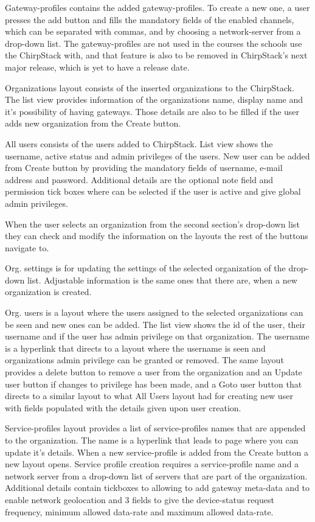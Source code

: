 Gateway-profiles contains the added gateway-profiles.
To create a new one, a user presses the add button and fills the mandatory fields of the enabled channels, which can be separated with commas, and by choosing a network-server from a drop-down list.
The gateway-profiles are not used in the courses the schools use the ChirpStack with, and that feature is also to be removed in ChirpStack's next major release, which is yet to have a release date.

Organizations layout consists of the inserted organizations to the ChirpStack.
The list view provides information of the organizations name, display name and it's possibility of having gateways.
Those details are also to be filled if the user adds new organization from the Create button.

All users consists of the users added to ChirpStack.
List view shows the username, active status and admin privileges of the users.
New user can be added from Create button by providing the mandatory fields of username, e-mail address and password. Additional details are the optional note field and permission tick boxes where can be selected if the user is active and give global admin privileges.

When the user selects an organization from the second section's drop-down list they can check and modify the information on the layouts the rest of the buttons navigate to.

Org. settings is for updating the settings of the selected organization of the drop-down list.
Adjustable information is the same ones that there are, when a new organization is created.

Org. users is a layout where the users assigned to the selected organizations can be seen and new ones can be added.
The list view shows the id of the user, their username and if the user has admin privilege on that organization.
The username is a hyperlink that directs to a layout where the username is seen and organizations admin privilege can be granted or removed.
The same layout provides a delete button to remove a user from the organization and an Update user button if changes to privilege has been made, and a Goto user button that directs to a similar layout to what All Users layout had for creating new user with fields populated with the details given upon user creation.

Service-profiles layout provides a list of service-profiles names that are appended to the organization.
The name is a hyperlink that leads to page where you can update it's details.
When a new service-profile is added from the Create button a new layout opens.
Service profile creation requires a service-profile name and a network server from a drop-down list of servers that are part of the organization.
Additional details contain tickboxes to allowing to add gateway meta-data and to enable network geolocation and 3 fields to give the device-status request frequency, minimum allowed data-rate and maximum allowed data-rate.

